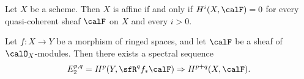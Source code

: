     \begin{theorem}\label{thm:affine_criterion_by_Serre}
        Let \(X\) be a scheme.
        Then \(X\) is affine if and only if \(H^i(X,\calF) = 0\) for every quasi-coherent sheaf \(\calF\) on \(X\) and every \(i>0\).
    \end{theorem}

    \begin{theorem}\label{thm:Leray_spectral_sequence}
        Let \(f:X\to Y\) be a morphism of ringed spaces, and let \(\calF\) be a sheaf of \(\calO_X\)-modules.
        Then there exists a spectral sequence
        \[
            E_2^{p,q} = H^p(Y,\sfR^q f_*\calF) \Rightarrow H^{p+q}(X,\calF).
        \]
    \end{theorem}

